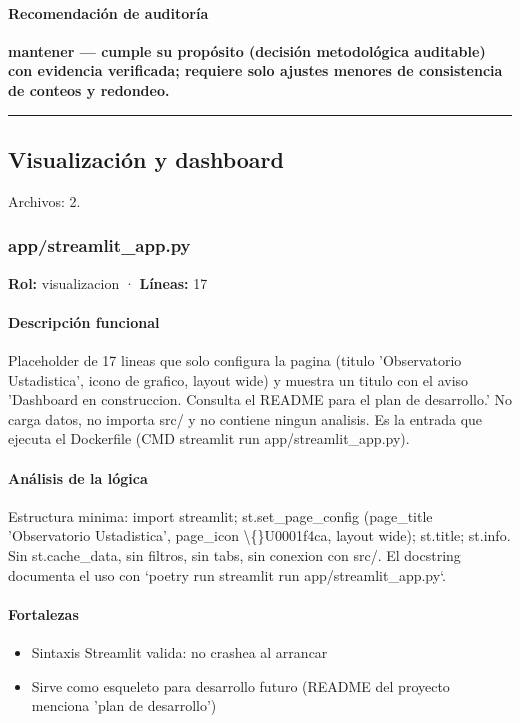 \paragraph{Recomendación de auditoría}
\textbf{mantener --- cumple su propósito (decisión metodológica auditable) con evidencia verificada; requiere solo ajustes menores de consistencia de conteos y redondeo.}

\medskip
\hrule

\subsection{Visualización y dashboard}
\noindent Archivos: 2.

\subsubsection{app/streamlit\_app.py}
\textbf{Rol:} visualizacion · \textbf{Líneas:} 17

\paragraph{Descripción funcional}
Placeholder de 17 lineas que solo configura la pagina (titulo 'Observatorio Ustadistica', icono de grafico, layout wide) y muestra un titulo con el aviso 'Dashboard en construccion. Consulta el README para el plan de desarrollo.' No carga datos, no importa src/ y no contiene ningun analisis. Es la entrada que ejecuta el Dockerfile (CMD streamlit run app/streamlit\_app.py).

\paragraph{Análisis de la lógica}
Estructura minima: import streamlit; st.set\_page\_config (page\_title 'Observatorio Ustadistica', page\_icon \textbackslash\{\}U0001f4ca, layout wide); st.title; st.info. Sin st.cache\_data, sin filtros, sin tabs, sin conexion con src/. El docstring documenta el uso con `poetry run streamlit run app/streamlit\_app.py`.

\paragraph{Fortalezas}
\begin{itemize}
  \item Sintaxis Streamlit valida: no crashea al arrancar
  \item Sirve como esqueleto para desarrollo futuro (README del proyecto menciona 'plan de desarrollo')
\end{itemize}


